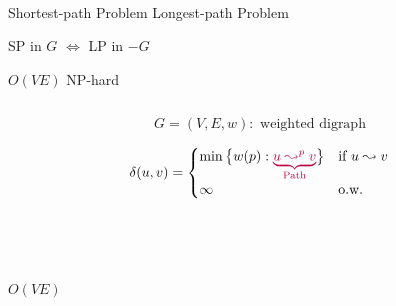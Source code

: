 
\begin{frame}{}
  \begin{center}
     \\[25pt]

    Shortest-path Problem  \quad Longest-path Problem \\[15pt] \pause

    \textsf{SP} in $G$ $\iff$ \textsf{LP} in $-G$ \\[15pt] \pause

    $O(VE)$ {\small {}}  \quad \textsf{NP}-hard {\small {}} \pause
  \end{center}

  \begin{columns}
      \pause
      \pause
  \end{columns}
\end{frame}

\begin{frame}{}
  \begin{definition}
    \[
      G = (V, E, w): \text{ weighted digraph}
    \]

    \[
      \delta(u,v) = \begin{cases}
	\min \big\{ w(p): \textcolor{purple}{\underbrace{u \leadsto^{p} v}_{\text{Path}}} \big\} & \text{if } u \leadsto v \\
	\infty	& \text{o.w.}
      \end{cases}
    \]
  \end{definition}

  \pause
  \vspace{0.60cm}
  \begin{center}
     \\[15pt] \pause

     \\[15pt] \pause

    $O(VE)$
  \end{center}
\end{frame}

